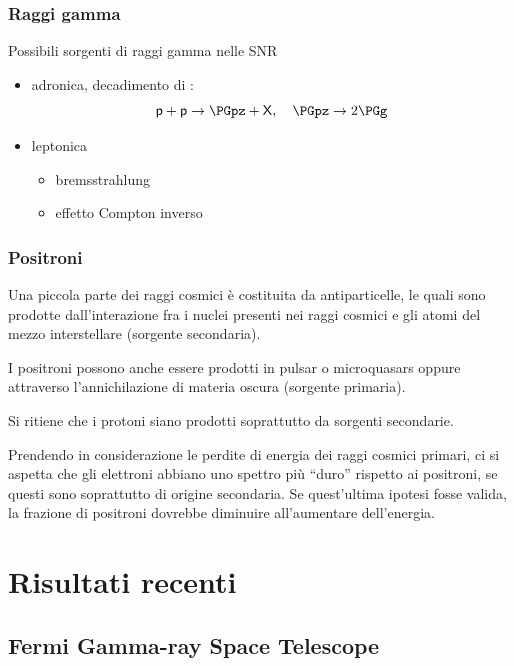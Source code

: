 \documentclass[10pt]{beamer}
\begin{document}
\begin{frame}
  \frametitle{Raggi gamma}
  Possibili sorgenti di raggi gamma nelle SNR
  \begin{itemize}
  \item<+-> adronica, decadimento di \PGpz:
    \begin{equation*}
      \mathsf{p} + \mathsf{p} \to \PGpz + \mathsf{X}, \quad \PGpz \to 2\PGg
    \end{equation*}
  \item<+-> leptonica
    \begin{itemize}
    \item bremsstrahlung
    \item effetto Compton inverso
    \end{itemize}
  \end{itemize}
\end{frame}


\begin{frame}
  \frametitle{Positroni}
  Una piccola parte dei raggi cosmici è costituita da antiparticelle, le quali
  sono prodotte dall'interazione fra i nuclei presenti nei raggi cosmici e gli
  atomi del mezzo interstellare (\alert{sorgente secondaria}).

  I positroni possono anche essere prodotti in pulsar o microquasars oppure
  attraverso l'annichilazione di materia oscura (\alert{sorgente primaria}).

  Si ritiene che i protoni siano
  \alert{prodotti soprattutto da sorgenti secondarie}.

  Prendendo in considerazione le perdite di energia dei raggi cosmici primari,
  ci si aspetta che gli elettroni abbiano uno spettro più ``duro'' rispetto ai
  positroni, se questi sono soprattutto di origine secondaria.  Se quest'ultima
  ipotesi fosse valida,
  \alert{la frazione di positroni dovrebbe diminuire all'aumentare
    dell'energia}.
\end{frame}

\section{Risultati recenti}

\subsection{Fermi Gamma-ray Space Telescope}
\end{document}
